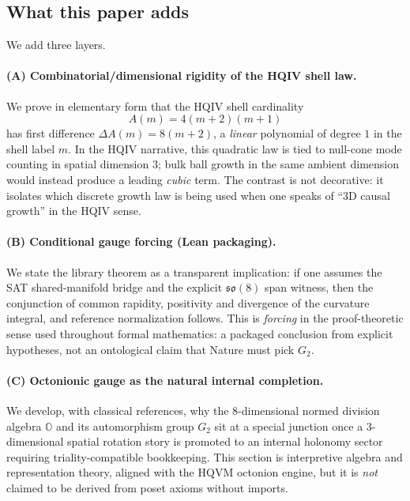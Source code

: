 \documentclass[11pt]{amsart}
\begin{document}
\subsection{What this paper adds}

We add three layers.

\paragraph{(A) Combinatorial/dimensional rigidity of the HQIV shell law.}
We prove in elementary form that the HQIV shell cardinality
\[
A(m)=4(m+2)(m+1)
\]
has first difference \(\Delta A(m)=8(m+2)\), a \emph{linear} polynomial of degree \(1\) in the shell label \(m\). In the HQIV narrative, this quadratic law is tied to null-cone mode counting in spatial dimension \(3\); bulk ball growth in the same ambient dimension would instead produce a leading \emph{cubic} term. The contrast is not decorative: it isolates which discrete growth law is being used when one speaks of ``\(3\)D causal growth'' in the HQIV sense.

\paragraph{(B) Conditional gauge forcing (Lean packaging).}
We state the library theorem  as a transparent implication: if one assumes the SAT shared-manifold bridge and the explicit \(\mathfrak{so}(8)\) span witness, then the conjunction of common rapidity, positivity and divergence of the curvature integral, and reference normalization follows. This is \emph{forcing} in the proof-theoretic sense used throughout formal mathematics: a packaged conclusion from explicit hypotheses, not an ontological claim that Nature must pick \(G_2\).

\paragraph{(C) Octonionic gauge as the natural internal completion.}
We develop, with classical references, why the \(8\)-dimensional normed division algebra \(\mathbb{O}\) and its automorphism group \(G_2\) sit at a special junction once a \(3\)-dimensional spatial rotation story is promoted to an internal holonomy sector requiring triality-compatible bookkeeping. This section is interpretive algebra and representation theory, aligned with the HQVM octonion engine, but it is \emph{not} claimed to be derived from poset axioms without imports.
\end{document}
